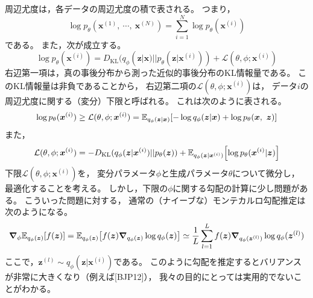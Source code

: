 \documentclass[dvipdfmx, fleqn, draft]{jsarticle}
\begin{document}
周辺尤度は，各データの周辺尤度の積で表される。
つまり，
\begin{equation*}
    \log{p_{\theta} (\bm{x}^{(1)},\ \cdots,\ \bm{x}^{(N)})} = \sum_{i=1}^{N} \log{p_{\theta} (\bm{x}^{(i)})}
\end{equation*}
である。
また，次が成立する。
\begin{equation}
    \log{p_{\theta} (\bm{x}^{(i)})}
        = D_\mathrm{KL} (q_{\phi} (\bm{z} | \bm{x}) || p_{\theta} (\bm{z} | \bm{x}^{(i)}))
            + \mathcal{L} (\theta, \phi; \bm{x}^{(i)})
    \label{eq:marginal_log_likelihood}
\end{equation}
右辺第一項は，真の事後分布から測った近似的事後分布のKL情報量である。
このKL情報量は非負であることから，
右辺第二項の\(\mathcal{L} (\theta, \phi; \bm{x}^{(i)})\)は，
データ\(i\)の周辺尤度に関する（変分）下限と呼ばれる。
これは次のように表される。
\begin{equation}
    \log{p_{\theta} (\bm{x}^{(i)})}
        \ge \mathcal{L} (\theta, \phi; \bm{x}^{(i)})
        = \mathbb{E}_{q_{\phi} (\bm{z} | \bm{x})} \qty[-\log{q_{\phi} (\bm{z} | \bm{x})} + \log{p_{\theta} (\bm{x},\ \bm{z})}]
    \label{eq:derivation_variational_lower_bound}
\end{equation}
また，
\begin{equation}
    \mathcal{L} (\theta, \phi; \bm{x}^{(i)})
        = -D_\mathrm{KL} (q_{\phi} (\bm{z} | \bm{x}^{(i)}) || p_{\theta} (\bm{z}))
            + \mathbb{E}_{q_{\phi} (\bm{z} | \bm{x}^{(i)})} \qty[\log{p_{\theta} (\bm{x}^{(i)} | \bm{z})}]
    \label{eq:variational_lower_bound}
\end{equation}
下限\(\mathcal{L} (\theta, \phi; \bm{x}^{(i)})\)を，
変分パラメータ\(\phi\)と生成パラメータ\(\theta\)について微分し，
最適化することを考える。
しかし，下限の\(\phi\)に関する勾配の計算に少し問題がある。
こういった問題に対する，
通常の（ナイーブな）モンテカルロ勾配推定は次のようになる。
\begin{equation*}
    \grad_{\phi} \mathbb{E}_{q_{\phi} (\bm{z})} \qty[f(\bm{z})]
        = \mathbb{E}_{q_{\phi} (\bm{z})} \qty[f(\bm{z}) \grad_{q_{\phi} (\bm{z})} \log{q_{\phi} (\bm{z})}]
        \simeq \frac{1}{L} \sum_{l=1}^{L} f(\bm{z}) \grad_{q_{\phi} (\bm{z}^{(l)})} \log{q_{\phi} (\bm{z}^{(l)})}
\end{equation*}
ここで，\(\bm{z}^{(l)} \sim q_{\phi} (\bm{z} | \bm{x}^{(i)})\)である。
このように勾配を推定するとバリアンスが非常に大きくなり（例えば[BJP12]），
我々の目的にとっては実用的でないことがわかる。
\end{document}
